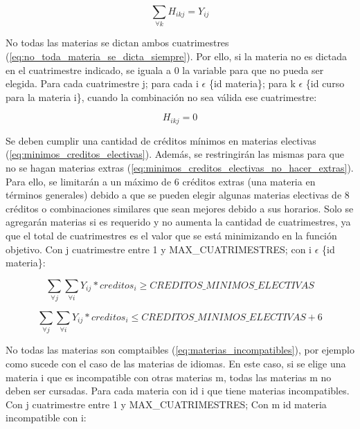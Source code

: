 \documentclass[a4paper]{article}
\begin{document}
\begin{equation}\label{eq:materia_se_cursa_en_solo_un_curso}
\sum_{\forall k} H_{ikj} = Y_{ij}
\end{equation}

No todas las materias se dictan ambos cuatrimestres (\ref{eq:no_toda_materia_se_dicta_siempre}). Por ello, si la materia no es dictada en el cuatrimestre indicado, se iguala a 0 la variable para que no pueda ser elegida. Para cada cuatrimestre j; para cada i $\epsilon$ \{id materia\}; para k $\epsilon$ \{id curso para la materia i\}, cuando la combinación no sea válida ese cuatrimestre:

\begin{equation}\label{eq:no_toda_materia_se_dicta_siempre}
H_{ikj} = 0
\end{equation}

Se deben cumplir una cantidad de créditos mínimos en materias electivas (\ref{eq:minimos_creditos_electivas}). Además, se restringirán las mismas para que no se hagan materias extras (\ref{eq:minimos_creditos_electivas_no_hacer_extras}). Para ello, se limitarán a un máximo de 6 créditos extras (una materia en términos generales) debido a que se pueden elegir algunas materias electivas de 8 créditos o combinaciones similares que sean mejores debido a sus horarios. Solo se agregarán materias si es requerido y no aumenta la cantidad de cuatrimestres, ya que el total de cuatrimestres es el valor que se está minimizando en la función objetivo. Con j cuatrimestre entre 1 y MAX\_CUATRIMESTRES; con i $\epsilon$ \{id materia\}:

\begin{equation}\label{eq:no_toda_materia_se_dicta_siempre}
\sum_{\forall j} \sum_{\forall i} Y_{ij} * creditos_i \geq CREDITOS\_MINIMOS\_ELECTIVAS
\end{equation}

\begin{equation}\label{eq:minimos_creditos_electivas_no_hacer_extras}
\sum_{\forall j} \sum_{\forall i} Y_{ij} * creditos_i \leq CREDITOS\_MINIMOS\_ELECTIVAS + 6
\end{equation}

No todas las materias son comptaibles (\ref{eq:materias_incompatibles}), por ejemplo como sucede con el caso de las materias de idiomas. En este caso, si se elige una materia i que es incompatible con otras materias m, todas las materias m no deben ser cursadas. Para cada materia con id i que tiene materias incompatibles. Con j cuatrimestre entre 1 y MAX\_CUATRIMESTRES; Con m id materia incompatible con i:
\end{document}
